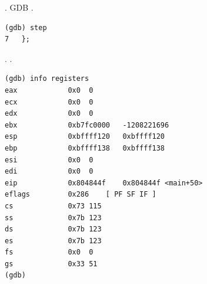 .
GDB .

\begin{lstlisting}
(gdb) step
7	};
\end{lstlisting}

.
\EAX {}.

\begin{lstlisting}
(gdb) info registers
eax            0x0	0
ecx            0x0	0
edx            0x0	0
ebx            0xb7fc0000	-1208221696
esp            0xbffff120	0xbffff120
ebp            0xbffff138	0xbffff138
esi            0x0	0
edi            0x0	0
eip            0x804844f	0x804844f <main+50>
eflags         0x286	[ PF SF IF ]
cs             0x73	115
ss             0x7b	123
ds             0x7b	123
es             0x7b	123
fs             0x0	0
gs             0x33	51
(gdb) 
\end{lstlisting}

